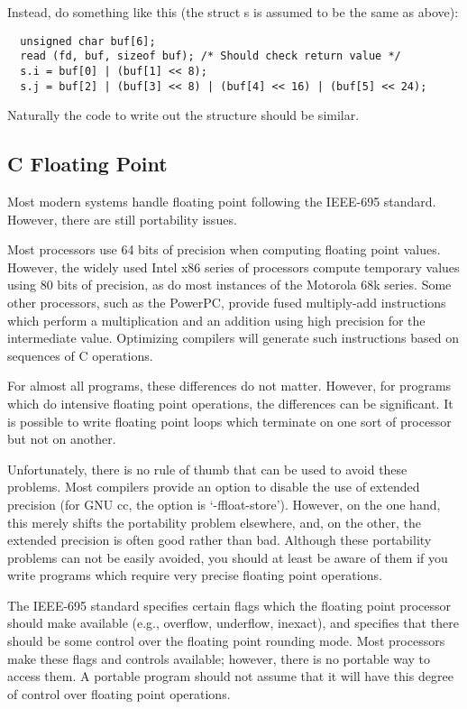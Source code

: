 Instead, do something like this (the struct s is assumed to be the same as above):
 	

\begin{verbatim}
  unsigned char buf[6];
  read (fd, buf, sizeof buf); /* Should check return value */
  s.i = buf[0] | (buf[1] << 8);
  s.j = buf[2] | (buf[3] << 8) | (buf[4] << 16) | (buf[5] << 24);
\end{verbatim}

Naturally the code to write out the structure should be similar.

\subsection{C Floating Point}

Most modern systems handle floating point following the IEEE-695 standard. However, there are still portability issues.

Most processors use 64 bits of precision when computing floating point values. However, the widely used Intel x86 series of processors compute temporary values using 80 bits of precision, as do most instances of the Motorola 68k series. Some other processors, such as the PowerPC, provide fused multiply-add instructions which perform a multiplication and an addition using high precision for the intermediate value. Optimizing compilers will generate such instructions based on sequences of C operations.

For almost all programs, these differences do not matter. However, for programs which do intensive floating point operations, the differences can be significant. It is possible to write floating point loops which terminate on one sort of processor but not on another.

Unfortunately, there is no rule of thumb that can be used to avoid these problems. Most compilers provide an option to disable the use of extended precision (for GNU cc, the option is `-ffloat-store'). However, on the one hand, this merely shifts the portability problem elsewhere, and, on the other, the extended precision is often good rather than bad. Although these portability problems can not be easily avoided, you should at least be aware of them if you write programs which require very precise floating point operations.

The IEEE-695 standard specifies certain flags which the floating point processor should make available (e.g., overflow, underflow, inexact), and specifies that there should be some control over the floating point rounding mode. Most processors make these flags and controls available; however, there is no portable way to access them. A portable program should not assume that it will have this degree of control over floating point operations. 

